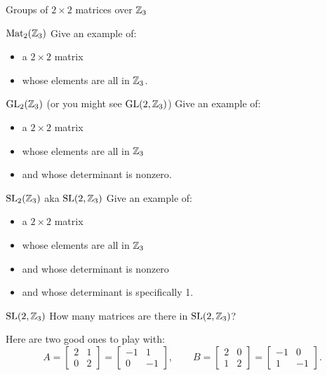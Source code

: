 \documentclass[8pt]{beamer}
\begin{document}
\begin{frame}{Groups of $2\times 2$ matrices over $\mathbb{Z}_3$} \pause

  \begin{exampleblock}{$\operatorname{Mat}_2(\mathbb{Z}_3)$}
    Give an example of:
    \begin{itemize}
      \item a $2\times 2$ matrix 
      \item whose elements are all in $\mathbb{Z}_3$.
    \end{itemize} 
    
  \end{exampleblock} \pause

  \begin{exampleblock}{$\operatorname{GL}_2(\mathbb{Z}_3)$ (or you might see $\operatorname{GL}(2, \mathbb{Z}_3)$)}
    Give an example of:
    \begin{itemize}
      \item a $2\times 2$ matrix 
      \item whose elements are all in $\mathbb{Z}_3$ \pause
      \item and whose determinant is nonzero.
    \end{itemize} 
  \end{exampleblock} \pause

  \begin{exampleblock}{$\operatorname{SL}_2(\mathbb{Z}_3)$ aka $\operatorname{SL}(2, \mathbb{Z}_3)$}
    Give an example of:
    \begin{itemize}
      \item a $2\times 2$ matrix 
      \item whose elements are all in $\mathbb{Z}_3$
      \item and whose determinant is nonzero \pause
      \item and whose determinant is specifically 1.
    \end{itemize} 
  \end{exampleblock}
  
\end{frame}


\begin{frame}{$\operatorname{SL}(2, \mathbb{Z}_3)$}
  How many matrices are there in $\operatorname{SL}(2, \mathbb{Z}_3)$? 

  \medskip \pause

  Here are two good ones to play with:
  \[
  A=\begin{bmatrix}2&1\\0&2\end{bmatrix}
  =\begin{bmatrix}-1&1\\0&-1\end{bmatrix},\qquad
  B=\begin{bmatrix}2&0\\1&2\end{bmatrix}
  =\begin{bmatrix}-1&0\\1&-1\end{bmatrix}. 
  \]
\end{frame}
\end{document}
